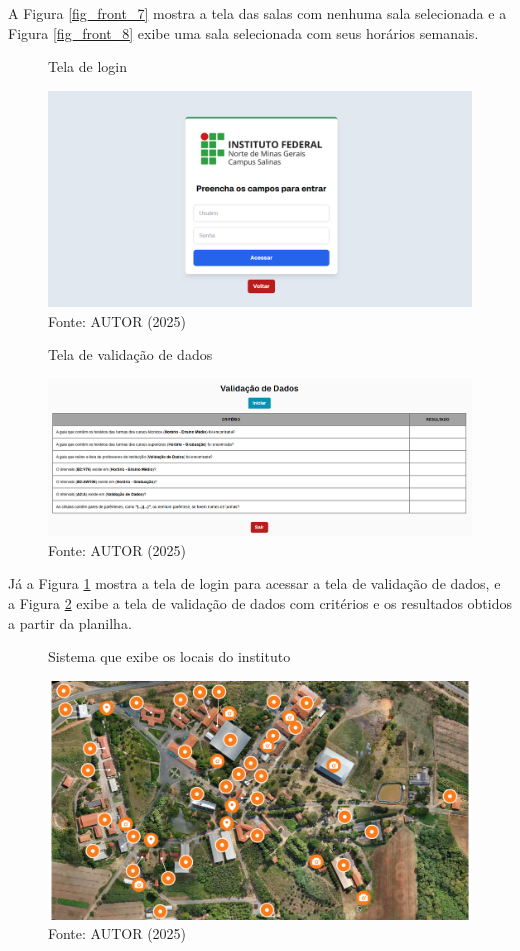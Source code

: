 A Figura \ref{fig_front_7} mostra a tela das salas com nenhuma sala selecionada e a Figura \ref{fig_front_8} exibe uma sala selecionada com seus horários semanais.

\begin{figure}[htb]
    \centering
    \caption{Tela de login}
    \includegraphics[width=1\textwidth]{Figuras/front-9.png}
    \caption*{Fonte: AUTOR (2025)}
    \label{fig_front_9}
\end{figure}

\begin{figure}[H]
    \centering
    \caption{Tela de validação de dados}
    \includegraphics[width=1\textwidth]{Figuras/front-10.png}
    \caption*{Fonte: AUTOR (2025)}
    \label{fig_front_10}
\end{figure}

Já a Figura \ref{fig_front_9} mostra a tela de login para acessar a tela de validação de dados, e a Figura \ref{fig_front_10} exibe a tela de validação de dados com critérios e os resultados obtidos a partir da planilha.

\begin{figure}[htb]
    \centering
    \caption{Sistema que exibe os locais do instituto}
    \includegraphics[width=1\textwidth]{Figuras/front-11.png}
    \caption*{Fonte: AUTOR (2025)}
    \label{fig_front_11}
\end{figure}

